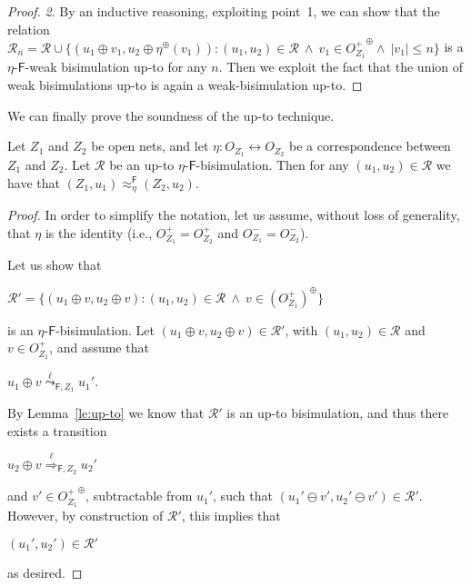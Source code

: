 \documentclass{LMCS}
\newcommand{\mon}[1]{\ensuremath{{#1}^\oplus}}
\newcommand{\wltr}[3][x]{\ensuremath{\stackrel{{#3}}{\leadsto}_{\mathsf{#1},#2}}}
\newcommand{\Ltr}[3][x]{\ensuremath{\stackrel{{#3}}{\Longrightarrow}_{\mathsf{#1},#2}}}
\begin{document}
\begin{proof}
  \medskip
  
  \emph{2}.
By an inductive reasoning, exploiting point~1, we can show that
  the relation $\mathcal{R}_n = \mathcal{R} \cup \{ (u_1 \oplus v_1,
  u_2 \oplus \mon{\eta}(v_1)) : (u_1, u_2) \in \mathcal{R}\ \wedge\
  v_1 \in \mon{O_{Z_1}^+}\wedge\ |v_1| \leq n \}$ is a
  $\eta$-$\mathsf{F}$-weak bisimulation up-to for any $n$. Then we
  exploit the fact that the union of weak bisimulations up-to is again
  a weak-bisimulation up-to.
\end{proof}

We can finally prove the soundness of the up-to technique.

\begin{prop}
  \label{pr:upto}
  Let $Z_1$ and $Z_2$ be open nets, and let $\eta : O_{Z_1}
  \leftrightarrow O_{Z_2}$ be a correspondence between $Z_1$ and $Z_2$.
  Let $\mathcal{R}$ be an up-to $\eta$-$\mathsf{F}$-bisimulation. Then for any
  $(u_1, u_2) \in \mathcal{R}$ we have that $(Z_1,u_1) \approx^{\mathsf{F}}_\eta
  (Z_2,u_2)$.
\end{prop}

\begin{proof}
  In order to simplify the notation, let us assume, without loss of
  generality, that $\eta$ is the identity (i.e., $O_{Z_1}^+ = O_{Z_2}^+$
  and $O_{Z_1}^- = O_{Z_2}^-$).

  Let us show that
  \begin{center}
    $\mathcal{R}' = \{ ( u_1 \oplus v, u_2 \oplus v) : (u_1, u_2) \in
    \mathcal{R}\ \land\ v \in \mon{(O_{Z_1}^+)} \}$
  \end{center}
  is an $\eta$-$\mathsf{F}$-bisimulation. Let $(u_1 \oplus v, u_2 \oplus v) \in
  \mathcal{R}'$, with $(u_1, u_2) \in \mathcal{R}$ and $v \in O_{Z_1}^+$,
  and assume that
  \begin{center}
    $u_1 \oplus v \wltr[F]{Z_1}{\ell} u_1'$.
  \end{center}

  
  By Lemma~\ref{le:up-to} we know that $\mathcal{R}'$ is an up-to
  bisimulation, and thus there exists a transition
  \begin{center}
    $u_2 \oplus v \Ltr[F]{Z_2}{\ell} u_2'$
  \end{center}
  and $v' \in \mon{O_{Z_1}^+}$, subtractable from $u_1'$, such that $(u_1'
  \ominus v', u_2' \ominus v') \in \mathcal{R}'$. However, by
  construction of $\mathcal{R'}$, this implies that
   \begin{center}
     $(u_1', u_2') \in \mathcal{R}'$
  \end{center}
  as desired.
\end{proof}
\end{document}
